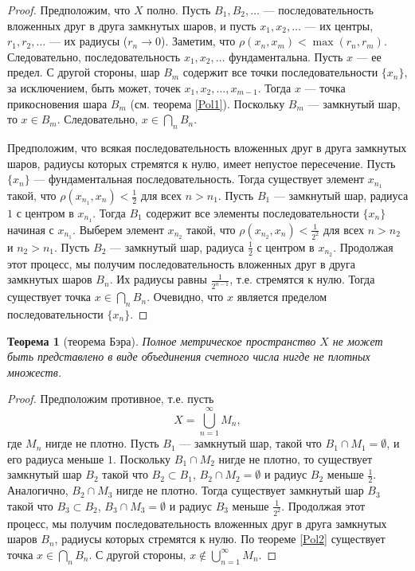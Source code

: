 \documentclass[12pt, titlepage, oneside]{amsbook}
\newtheorem{theorem}{Теорема}[chapter]
\theoremstyle{definition}
\theoremstyle{remark}
\begin{document}
\begin{proof}
	Предположим, что $X$ полно. Пусть $B_1, B_2,\ldots$ --- последовательность вложенных друг в друга замкнутых шаров, и пусть $x_1,x_2,\ldots$ --- их центры, $r_1,r_2,\ldots$ --- их радиусы ($r_n\rightarrow 0$). Заметим, что $\rho(x_n,x_m)<\max(r_n,r_m)$. Следовательно, последовательность $x_1,x_2,\ldots$ фундаментальна. Пусть $x$ --- ее предел. С другой стороны, шар $B_m$ содержит все точки последовательности $\{x_n\}$, за исключением, быть может, точек $x_1,x_2,\ldots,x_{m-1}$. Тогда $x$ --- точка прикосновения шара $B_m$ (см. теорема \ref{Pol1}). Поскольку $B_m$ --- замкнутый шар, то $x\in B_m$. Следовательно, $x\in\bigcap\limits_n B_n$.
	
	Предположим, что всякая последовательность вложенных друг в друга замкнутых шаров, радиусы которых стремятся к нулю, имеет непустое пересечение. Пусть $\{x_n\}$ --- фундаментальная последовательность. Тогда существует элемент $x_{n_1}$ такой, что $\rho(x_{n_1}, x_n)<\frac{1}{2}$ для всех $n>n_1$. Пусть $B_1$ --- замкнутый шар, радиуса $1$ с центром в $x_{n_1}$. Тогда $B_1$ содержит все элементы последовательности $\{x_n\}$ начиная с $x_{n_1}$. Выберем элемент $x_{n_2}$ такой, что $\rho(x_{n_2}, x_n)<\frac{1}{2^2}$ для всех $n>n_2$ и $n_2>n_1$. Пусть $B_2$ --- замкнутый шар, радиуса $\frac{1}{2}$ с центром в $x_{n_2}$. Продолжая этот процесс, мы получим последовательность вложенных друг в друга замкнутых шаров $B_n$. Их радиусы равны $\frac{1}{2^{n-1}}$, т.е. стремятся к нулю. Тогда существует точка $x\in\bigcap\limits_n B_n$. Очевидно, что $x$ является пределом последовательности $\{x_n\}$.
\end{proof}

\begin{theorem}[теорема Бэра]
	\label{Pol3}
	Полное метрическое пространство $X$ не может быть представлено в виде объединения счетного числа нигде не плотных множеств.
\end{theorem}

\begin{proof}
	Предположим противное, т.е. пусть $$X=\bigcup\limits_{n=1}^{\infty}M_n,$$ где $M_n$ нигде не плотно. Пусть $B_1$ --- замкнутый шар, такой что $B_1\cap M_1=\emptyset$, и его радиуса меньше $1$. Поскольку $B_1\cap M_2$ нигде не плотно, то существует замкнутый шар $B_2$  такой что $B_2\subset B_1$, $B_2\cap M_2=\emptyset$ и радиус $B_2$ меньше $\frac{1}{2}$. Аналогично, $B_2\cap M_3$ нигде не плотно. Тогда существует замкнутый шар $B_3$  такой что $B_3\subset B_2$, $B_3\cap M_3=\emptyset$ и радиус $B_3$ меньше $\frac{1}{2^2}$. Продолжая этот процесс, мы получим последовательность вложенных друг в друга замкнутых шаров $B_n$, радиусы которых стремятся к нулю. По теореме \ref{Pol2} существует точка $x\in\bigcap\limits_n B_n$. С другой стороны, $x\not\in\bigcup\limits_{n=1}^{\infty}M_n$.
\end{proof}
\end{document}
